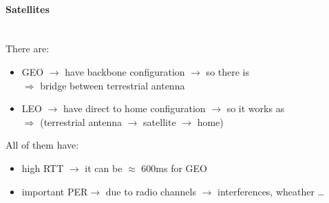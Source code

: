 \paragraph{Satellites}\mbox{}\\[0.2cm]
There are:
\begin{itemize}
    \item GEO $\rightarrow$ have backbone configuration $\rightarrow$ so there is\\
    $\Rightarrow$ bridge between terrestrial antenna
    \item LEO $\rightarrow$ have direct to home configuration $\rightarrow$ so it works as\\
    $\Rightarrow$ (terrestrial antenna $\rightarrow$ satellite $\rightarrow$ home)
\end{itemize}
All of them have:
\begin{itemize}
    \item high RTT $\rightarrow$ it can be $\approx$ 600ms for GEO
    \item important PER\footPER $\rightarrow$ due to radio channels $\rightarrow$
    interferences, wheather \dots
\end{itemize}

